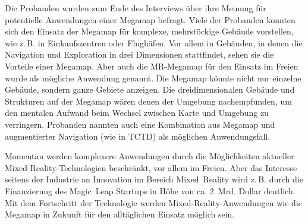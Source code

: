 Die Probanden wurden zum Ende des Interviews über ihre Meinung für potentielle Anwendungen einer Megamap befragt.
Viele der Probanden konnten sich den Einsatz der Megamap für komplexe, mehrstöckige Gebäude vorstellen, wie z.\,B. in Einkaufszentren oder Flughäfen.
Vor allem in Gebäuden, in denen die Navigation und Exploration in drei Dimensionen stattfindet, sehen sie die Vorteile einer Megamap.
Aber auch die MR-Megamap für den Einsatz im Freien wurde als mögliche Anwendung genannt.
Die Megamap könnte nicht nur einzelne Gebäude, sondern ganze Gebiete anzeigen.
Die dreidimensionalen Gebäude und Strukturen auf der Megamap wären denen der Umgebung nachempfunden, um den mentalen Aufwand beim Wechsel zwischen Karte und Umgebung zu verringern.
Probanden nannten auch eine Kombination aus Megamap und augmentierter Navigation (wie in TCTD) als möglichen Anwendungsfall.

Momentan werden komplexere Anwendungen durch die Möglichkeiten aktueller Mixed-Reality-Technologien beschränkt, vor allem im Freien.
Aber das Interesse seitens der Industrie an Innovation im Bereich Mixed~Reality wird z.\,B. durch die Finanzierung des Magic~Leap Startups in Höhe von ca. 2~Mrd. Dollar \parencite{Machkovech2017} deutlich.
Mit dem Fortschritt der Technologie werden Mixed-Reality-Anwendungen wie die Megamap in Zukunft für den alltäglichen Einsatz möglich sein.

%
\cleardoublepage
